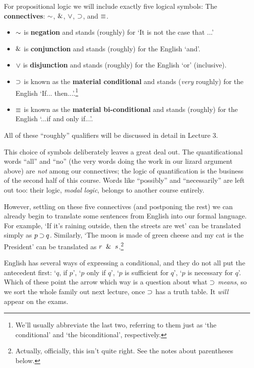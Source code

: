 \documentclass[options]{philosophersimprint}
\theoremstyle{definition}
\begin{document}
For propositional logic we will include exactly five logical symbols: The \textbf{connectives}: $\mathord{\sim}$, $\mathbin{\&}$, $\mathbin{\vee}$, $\mathbin{\supset}$, and $\mathbin{\equiv}$.
\begin{itemize}
    \item $\mathord{\sim}$ is \textbf{negation} and stands (roughly) for `It is not the case that ...'
    \item $\mathbin{\&}$ is \textbf{conjunction} and stands (roughly) for the English `and'.
    \item $\mathbin{\vee}$ is \textbf{disjunction} and stands (roughly) for the English `or' (inclusive).
    \item $\mathbin{\supset}$ is known as the \textbf{material conditional} and stands (\textit{very} roughly) for the English `If... then...'.\footnote{We'll usually abbreviate the last two, referring to them just as `the conditional' and `the biconditional', respectively.}
    \item $\mathbin{\equiv}$ is known as the \textbf{material bi-conditional} and stands (roughly) for the English `...if and only if...'.
\end{itemize}
All of these ``roughly'' qualifiers will be discussed in detail in Lecture 3.

This choice of symbols deliberately leaves a great deal out. The quantificational words ``all'' and ``no'' (the very words doing the work in our lizard argument above) are \textit{not} among our connectives; the logic of quantification is the business of the second half of this course. Words like ``possibly'' and ``necessarily'' are left out too: their logic, \textit{modal logic}, belongs to another course entirely.

However, settling on these five connectives (and postponing the rest) we can already begin to translate some sentences from English into our formal language. For example, `If it's raining outside, then the streets are wet' can be translated simply as $p \mathbin{\supset} q$. Similarly, `The moon is made of green cheese and my cat is the President' can be translated as $r \ \mathbin{\&} \  s$.\footnote{Actually, officially, this isn't quite right. See the notes about parentheses below.}

English has several ways of expressing a conditional, and they do not all put the antecedent first: `$q$, if $p$', `$p$ only if $q$', `$p$ is sufficient for $q$', `$p$ is necessary for $q$'. Which of these point the arrow which way is a question about what $\mathbin{\supset}$ \textit{means}, so we sort the whole family out next lecture, once $\mathbin{\supset}$ has a truth table. It \textit{will} appear on the exams.
\end{document}
